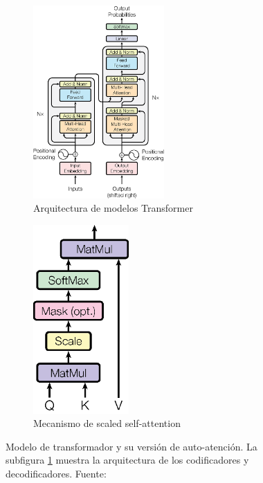 \begin{figure}[t]
    \centering
    \begin{subfigure}[t]{0.55\textwidth}
        \centering
        \includegraphics[width=0.55\textwidth]{img/02/transformer_architecture.png}
        \caption{Arquitectura de modelos Transformer}
        \label{fig:transformer_architecture}
    \end{subfigure}
    \begin{subfigure}[t]{0.40\textwidth}
        \centering
        \includegraphics[width=0.40\textwidth]{img/02/scaled_self_attention.png}
        \caption{Mecanismo de scaled self-attention}
        \label{fig:scaled_self_attention}
    \end{subfigure}
    \caption{Modelo de transformador y su versión de auto-atención. La subfigura \ref{fig:transformer_architecture} muestra la arquitectura de los codificadores y decodificadores. Fuente: \citet{vaswani2017attention}}
    \label{fig:transformer_mechanism}
\end{figure}

